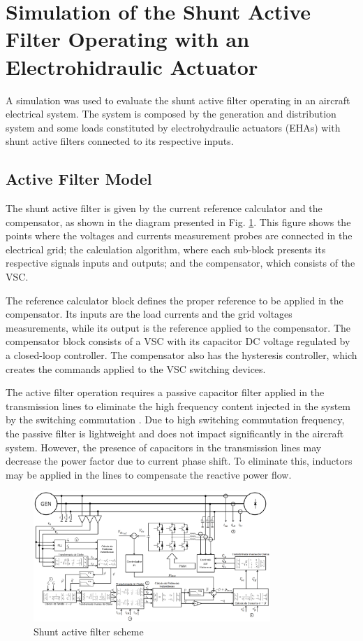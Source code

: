\section{Simulation of the Shunt Active Filter Operating with an Electrohidraulic Actuator}

A simulation was used to evaluate the shunt active filter operating in an aircraft electrical system. The system is composed by the generation and distribution system and some loads constituted by electrohydraulic actuators (EHAs) with shunt active filters connected to its respective inputs.

\subsection{Active Filter Model}

The shunt active filter is given by the current reference calculator and the compensator, as shown in the diagram presented in Fig. \ref{fig:filtro_blocos.png}. This figure shows the points where the voltages and currents measurement probes are connected in the electrical grid; the calculation algorithm, where each sub-block presents its respective signals inputs and outputs; and the compensator, which consists of the VSC.

The reference calculator block defines the proper reference to be applied in the compensator. Its inputs are the load currents and the grid voltages measurements, while its output is the reference applied to the compensator. The compensator block consists of a VSC with its capacitor DC voltage regulated by a closed-loop controller. The compensator also has the hysteresis controller, which creates the commands applied to the VSC switching devices.

The active filter operation requires a passive capacitor filter applied in the transmission lines to eliminate the high frequency content injected in the system by the switching commutation \cite{Akagi2007}. Due to high switching commutation frequency, the passive filter is lightweight and does not impact significantly in the aircraft system. However, the presence of capacitors in the transmission lines may decrease the power factor due to current phase shift. To eliminate this, inductors may be applied in the lines to compensate the reactive power flow.

\begin{figure}[!tb] %
	\centering
	\includegraphics[width=0.8\textwidth]{Figures/filtro_blocos.png}
	\caption{Shunt active filter scheme}
	\label{fig:filtro_blocos.png}
\end{figure}

